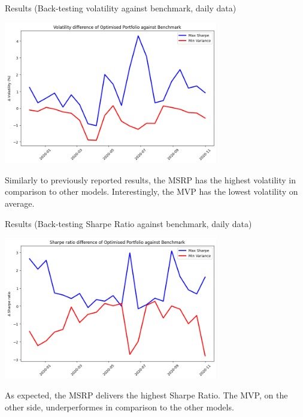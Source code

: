 \documentclass{beamer}
\begin{document}
\begin{frame}{Results (Back-testing volatility against benchmark, daily data)}
    \begin{center}
        \includegraphics[width=0.7\textwidth]{resources/Volatility difference of Optimised Portfolio against Benchmark.png}
    \end{center}    
\small{Similarly to previously reported results, the MSRP has the highest volatility in comparison to other models. Interestingly, the MVP has the lowest volatility on average.}
\end{frame}

\begin{frame}{Results (Back-testing Sharpe Ratio against benchmark, daily data)}
    \begin{center}
        \includegraphics[width=0.7\textwidth]{resources/Sharpe ratio difference of Optimised Portfolio against Benchmark.png}
    \end{center}
\small{As expected, the MSRP delivers the highest Sharpe Ratio. The MVP, on the other side, underperformes in comparison to the other models.}
\end{frame}
\end{document}
